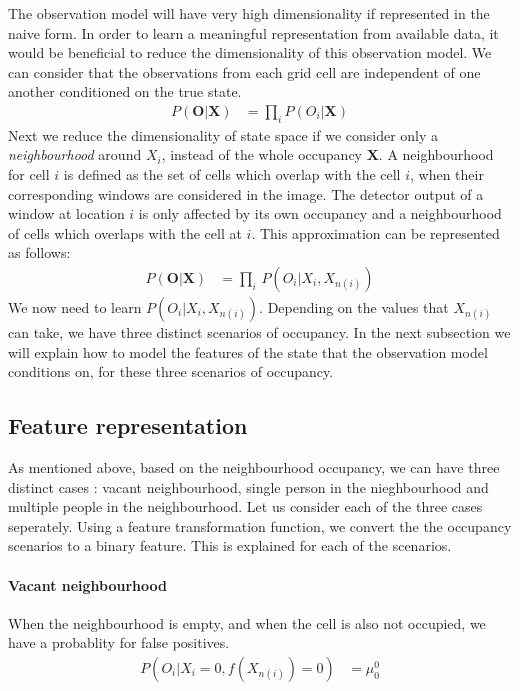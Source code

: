 \documentclass[10pt,twocolumn,letterpaper]{article}
\newcommand{\obs}{\mathbf{O}}
\newcommand{\state}{\mathbf{X}}
\begin{document}
The observation model will have very high dimensionality if represented in the naive form. In order to learn a meaningful representation from available data, it would be beneficial to reduce the dimensionality of this observation model.
We can consider that the observations from each grid cell are independent of one another conditioned on the true state.
\begin{align}
P(\textbf{O}|\textbf{X})&=\prod_{i} {P(O_{i}|\textbf{X})}
\end{align}
Next we reduce the dimensionality of state space if we consider only a \textit{neighbourhood} around $ X_{i} $, instead of the whole occupancy $\textbf{X} $. A neighbourhood for cell $i$ is defined as the set of cells which overlap with the cell $i$, when their corresponding windows are considered in the image. The detector output of a window at location $ i $ is only affected by its own occupancy and a neighbourhood of cells which overlaps with the cell at $ i$. This approximation can be represented as follows: 
\begin{align}
  P(\obs|\state) &= \prod_{i} \, P(O_{i}|X_{i},X_{n(i)})
\end{align}
We now need to learn  $ P(O_{i}|X_{i},X_{n(i)}) $. Depending on the values that $ X_{n(i)} $ can take, we have three distinct scenarios of occupancy. In the next subsection we will explain how to model the features of the state that the observation model conditions on, for these three scenarios of occupancy.

\subsection{Feature representation}

As mentioned above, based on the neighbourhood occupancy, we can have three distinct cases : vacant neighbourhood, single person in the nieghbourhood and multiple people in the neighbourhood. Let us consider each of the three cases seperately.
Using a feature transformation function, we convert the the occupancy scenarios to a binary feature. This is explained for each of the scenarios.

\paragraph{Vacant neighbourhood} When the neighbourhood is empty, and when the cell is also not occupied, we have a probablity for false positives.
\begin{align}
 P(O_{i} |X_{i}=0 ,f(X_{n(i)}) =0)  &=\mu^{0}_{0}
\end{align}
\end{document}
